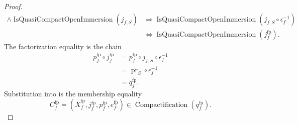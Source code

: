 \begin{proof}
\[\begin{aligned}
      \wedge\operatorname{IsQuasiCompactOpenImmersion}(j_{f,S})
      &\Longrightarrow
        \operatorname{IsQuasiCompactOpenImmersion}
          (j_{f,S}\circ\epsilon_f^{-1})\\
      &\Longleftrightarrow
        \operatorname{IsQuasiCompactOpenImmersion}(j_f^{\mathrm{fp}}).
  \end{aligned}
  \]
  The factorization equality is the chain
  \[
  \begin{aligned}
    p_f^{\mathrm{fp}}\circ j_f^{\mathrm{fp}}
      &=p_f^{\mathrm{fp}}\circ j_{f,S}\circ\epsilon_f^{-1}\\
      &=\operatorname{pr}_S\circ\epsilon_f^{-1}\\
      &=q_f^{\mathrm{fp}}.
  \end{aligned}
  \]
  Substitution into  is the membership
  equality
  \[
    C_f^{\mathrm{fp}}
      =(\overline X_f^{\mathrm{fp}},j_f^{\mathrm{fp}},
        p_f^{\mathrm{fp}},e_f^{\mathrm{fp}})
      \in\operatorname{Compactification}(q_f^{\mathrm{fp}}).
  \]
\end{proof}

